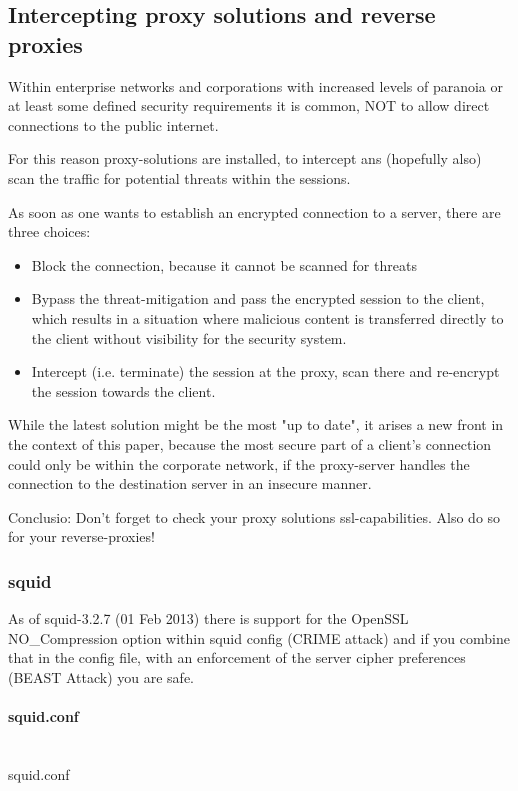 \subsection{Intercepting proxy solutions and reverse proxies}

Within enterprise networks and corporations with increased levels of paranoia or at least some defined security requirements it is common, NOT to allow direct connections to the public internet.

For this reason proxy-solutions are installed, to intercept ans (hopefully also) scan the traffic for potential threats within the sessions.

As soon as one wants to establish an encrypted connection to a server, there are three choices:

\begin{itemize}
\item Block the connection, because it cannot be scanned for threats
\item Bypass the threat-mitigation and pass the encrypted session to the client, which results in a situation where malicious content is transferred directly to the client without visibility for the security system.
\item Intercept (i.e. terminate) the session at the proxy, scan there and re-encrypt the session towards the client.
\end{itemize}

While the latest solution might be the most "up to date", it arises a new front in the context of this paper, because the most secure part of a client's connection could only be within the corporate network, if the proxy-server handles the connection to the destination server in an insecure manner.

Conclusio: Don't forget to check your proxy solutions ssl-capabilities. Also do so for your reverse-proxies!

\subsubsection{squid}


As of squid-3.2.7 (01 Feb 2013) there is support for the OpenSSL NO\_Compression option within squid config (CRIME attack) and if you combine that in the config file, with an enforcement of the server cipher preferences (BEAST Attack) you are safe.

\paragraph*{squid.conf}\mbox{}\\
squid.conf

